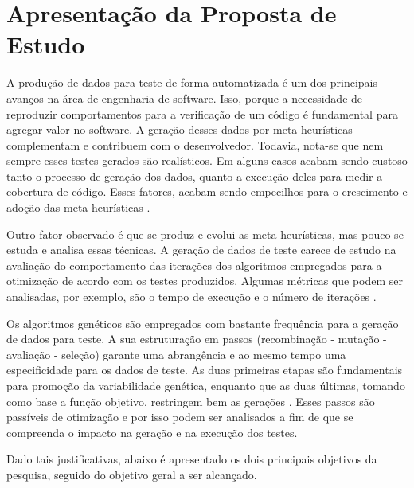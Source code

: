 \chapter[Apresentação da Proposta de Estudo]{Apresentação da Proposta de Estudo}
\label{propostaestudo}

A produção de dados para teste de forma automatizada é um dos principais avanços na área de engenharia de software. Isso, porque a necessidade de reproduzir comportamentos para a verificação de um código é fundamental para agregar valor no software. A geração desses dados por meta-heurísticas complementam e contribuem com o desenvolvedor. Todavia, nota-se que nem sempre esses testes gerados são realísticos. Em alguns casos acabam sendo custoso tanto o processo de geração dos dados, quanto a execução deles para medir a cobertura de código. Esses fatores, acabam sendo empecilhos para o crescimento e adoção das meta-heurísticas \cite{harman2015achievements}.

Outro fator observado é que se produz e evolui as meta-heurísticas, mas pouco se estuda e analisa essas técnicas. A geração de dados de teste carece de estudo na avaliação do comportamento das iterações dos algoritmos empregados para a otimização de acordo com os testes produzidos. Algumas métricas que podem ser analisadas, por exemplo, são o tempo de execução e o número de iterações \cite{rodrigues2018using}. 

Os algoritmos genéticos são empregados com bastante frequência para a geração de dados para teste. A sua estruturação em passos (recombinação - mutação - avaliação - seleção) garante uma abrangência e ao mesmo tempo uma especificidade para os dados de teste. As duas primeiras etapas são fundamentais para promoção da variabilidade genética, enquanto que as duas últimas, tomando como base a função objetivo, restringem bem as gerações \cite{rodrigues2018using}. Esses passos são passíveis de otimização e por isso podem ser analisados a fim de que se compreenda o impacto na geração e na execução dos testes.

Dado tais justificativas, abaixo é apresentado os dois principais objetivos da pesquisa, seguido do objetivo geral a ser alcançado. 

